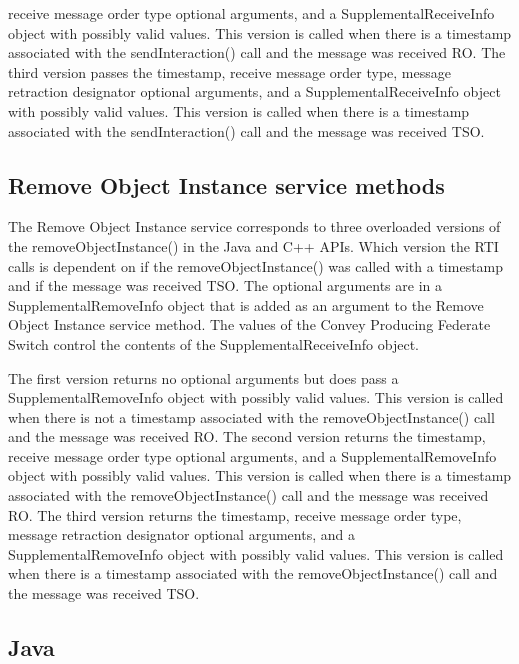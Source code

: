 \begin{compactstdpage}
    receive message order type optional arguments, and a SupplementalReceiveInfo object with possibly valid values. This version is called when there is a timestamp associated with the sendInteraction() call and the message was received RO. The third version passes the timestamp, receive message order type, message retraction designator optional arguments, and a SupplementalReceiveInfo object with possibly valid values. This version is called when there is a timestamp associated with the sendInteraction() call and the message was received TSO.

    \subsection{Remove Object Instance service methods}

    The Remove Object Instance service corresponds to three overloaded versions of the removeObjectInstance() in the Java and C++ APIs. Which version the RTI calls is dependent on if the removeObjectInstance() was called with a timestamp and if the message was received TSO. The optional arguments are in a SupplementalRemoveInfo object that is added as an argument to the Remove Object Instance service method. The values of the Convey Producing Federate Switch control the contents of the SupplementalReceiveInfo object.

    The first version returns no optional arguments but does pass a SupplementalRemoveInfo object with possibly valid values. This version is called when there is not a timestamp associated with the removeObjectInstance() call and the message was received RO. The second version returns the timestamp, receive message order type optional arguments, and a SupplementalRemoveInfo object with possibly valid values. This version is called when there is a timestamp associated with the removeObjectInstance() call and the message was received RO. The third version returns the timestamp, receive message order type, message retraction designator optional arguments, and a SupplementalRemoveInfo object with possibly valid values. This version is called when there is a timestamp associated with the removeObjectInstance() call and the message was received TSO.

    \subsection{Java}


\end{compactstdpage}

